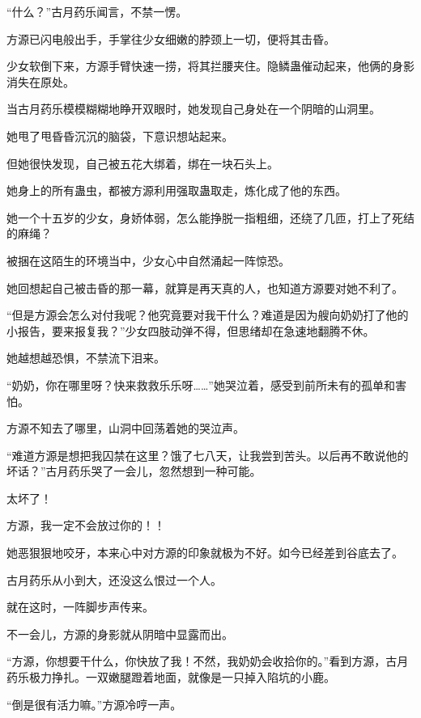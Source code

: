 
\begin{this_body}

“什么？”古月药乐闻言，不禁一愣。

方源已闪电般出手，手掌往少女细嫩的脖颈上一切，便将其击昏。

少女软倒下来，方源手臂快速一捞，将其拦腰夹住。隐鳞蛊催动起来，他俩的身影消失在原处。

当古月药乐模模糊糊地睁开双眼时，她发现自己身处在一个阴暗的山洞里。

她甩了甩昏昏沉沉的脑袋，下意识想站起来。

但她很快发现，自己被五花大绑着，绑在一块石头上。

她身上的所有蛊虫，都被方源利用强取蛊取走，炼化成了他的东西。

她一个十五岁的少女，身娇体弱，怎么能挣脱一指粗细，还绕了几匝，打上了死结的麻绳？

被捆在这陌生的环境当中，少女心中自然涌起一阵惊恐。

她回想起自己被击昏的那一幕，就算是再天真的人，也知道方源要对她不利了。

“但是方源会怎么对付我呢？他究竟要对我干什么？难道是因为艘向奶奶打了他的小报告，要来报复我？”少女四肢动弹不得，但思绪却在急速地翻腾不休。

她越想越恐惧，不禁流下泪来。

“奶奶，你在哪里呀？快来救救乐乐呀……”她哭泣着，感受到前所未有的孤单和害怕。

方源不知去了哪里，山洞中回荡着她的哭泣声。

“难道方源是想把我囚禁在这里？饿了七八天，让我尝到苦头。以后再不敢说他的坏话？”古月药乐哭了一会儿，忽然想到一种可能。

太坏了！

方源，我一定不会放过你的！！

她恶狠狠地咬牙，本来心中对方源的印象就极为不好。如今已经差到谷底去了。

古月药乐从小到大，还没这么恨过一个人。

就在这时，一阵脚步声传来。

不一会儿，方源的身影就从阴暗中显露而出。

“方源，你想要干什么，你快放了我！不然，我奶奶会收拾你的。”看到方源，古月药乐极力挣扎。一双嫩腿蹬着地面，就像是一只掉入陷坑的小鹿。

“倒是很有活力嘛。”方源冷哼一声。


\end{this_body}
